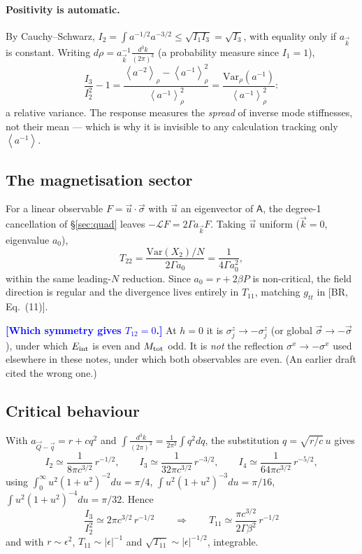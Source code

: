 \documentclass[11pt,a4paper]{article}
\newcommand{\bk}{\vec k}
\newcommand{\bQ}{\vec Q}
\newcommand{\bq}{\vec q}
\newcommand{\dk}{\frac{d^3k}{(2\pi)^3}}
\newcommand{\avg}[1]{\left\langle #1 \right\rangle}
\newcommand{\FLAG}[1]{\textcolor{blue}{\textbf{[#1]}}}
\newcommand{\Lc}{\mathcal{L}}
\newcommand{\Tm}{T}
\newcommand{\bk}{\vec k}
\newcommand{\bQ}{\vec Q}
\newcommand{\bq}{\vec q}
\newcommand{\bs}{\vec\sigma}
\newcommand{\dk}{\frac{d^3k}{(2\pi)^3}}
\newcommand{\avg}[1]{\left\langle #1 \right\rangle}
\newcommand{\FLAG}[1]{\textcolor{blue}{\textbf{[#1]}}}
\begin{document}
\paragraph{Positivity is automatic.} By Cauchy--Schwarz,
$I_2=\int a^{-1/2}a^{-3/2}\le\sqrt{I_1I_3}=\sqrt{I_3}$, with equality only if $a_{\bk}$ is
constant. Writing $d\rho=a_{\bk}^{-1}\dk$ (a probability measure since $I_1=1$),
\begin{equation}
  \frac{I_3}{I_2^2}-1=\frac{\avg{a^{-2}}_\rho-\avg{a^{-1}}_\rho^2}{\avg{a^{-1}}_\rho^{2}}
   =\frac{\mathrm{Var}_\rho(a^{-1})}{\avg{a^{-1}}_\rho^{2}} :
\end{equation}
a relative variance. The response measures the \emph{spread} of inverse mode stiffnesses,
not their mean --- which is why it is invisible to any calculation tracking only
$\avg{a^{-1}}$.

\subsection{The magnetisation sector}
For a linear observable $F=\vec u\cdot\bs$ with $\vec u$ an eigenvector of $\mathsf A$, the
degree-1 cancellation of \S\ref{sec:quad} leaves $-\Lc F=2\Gamma a_{\bk}F$. Taking $\vec u$
uniform ($\bk=0$, eigenvalue $a_0$),
\begin{equation}
  \Tm_{22}=\frac{\mathrm{Var}(X_2)/N}{2\Gamma a_0}=\frac{1}{4\Gamma a_0^{2}} ,
\end{equation}
within the same leading-$N$ reduction. Since $a_0=r+2\beta P$ is non-critical, the field
direction is regular and the divergence lives entirely in $\Tm_{11}$, matching $g_{tt}$ in
[BR, Eq.~(11)].

\FLAG{Which symmetry gives $\Tm_{12}=0$.} At $h=0$ it is $\sigma^z_j\to-\sigma^z_j$ (or
global $\bs\to-\bs$), under which $E_{\rm int}$ is even and $M_{\rm tot}$ odd. It is
\emph{not} the reflection $\sigma^x\to-\sigma^x$ used elsewhere in these notes, under which
both observables are even. (An earlier draft cited the wrong one.)

\subsection{Critical behaviour}
\label{sec:crit4}
With $a_{\bQ-\bq}=r+cq^2$ and $\int\!\dk=\tfrac{1}{2\pi^2}\int q^2dq$, the substitution
$q=\sqrt{r/c}\,u$ gives
\begin{equation}
  I_2\simeq\frac{1}{8\pi c^{3/2}}\,r^{-1/2},
  \qquad
  I_3\simeq\frac{1}{32\pi c^{3/2}}\,r^{-3/2},
  \qquad
  I_4\simeq\frac{1}{64\pi c^{3/2}}\,r^{-5/2},
\end{equation}
using $\int_0^\infty u^2(1+u^2)^{-2}du=\pi/4$, $\int u^2(1+u^2)^{-3}du=\pi/16$,
$\int u^2(1+u^2)^{-4}du=\pi/32$. Hence
\begin{equation}
  \boxed{\ \frac{I_3}{I_2^{2}}\simeq 2\pi c^{3/2}\,r^{-1/2}
  \qquad\Longrightarrow\qquad
  \Tm_{11}\simeq\frac{\pi c^{3/2}}{2\Gamma\beta^{2}}\,r^{-1/2}\ }
\end{equation}
and with $r\sim\epsilon^2$, $\Tm_{11}\sim|\epsilon|^{-1}$ and
$\sqrt{\Tm_{11}}\sim|\epsilon|^{-1/2}$, integrable.
\end{document}
